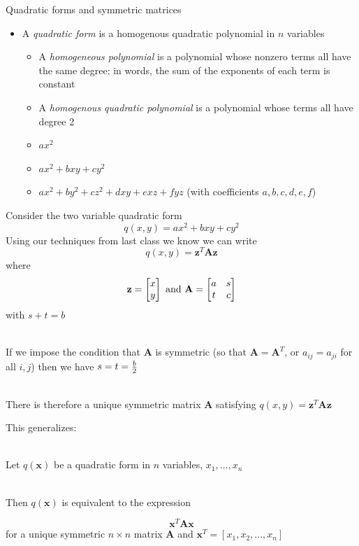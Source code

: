 \documentclass[10pt]{seminar}
\begin{document}
\begin{slide}
Quadratic forms and symmetric matrices

\begin{itemize}
\item A \textit{quadratic form} is a homogenous quadratic polynomial in $n$ variables
\begin{itemize}
\item A \textit{homogeneous polynomial} is a polynomial whose nonzero terms all have the same degree: in words, the sum of the exponents of each term is constant
\item A \textit{homogenous quadratic polynomial} is a polynomial whose terms all have degree 2
\item $a x^2$
\item $ax^2+bxy+cy^2$
\item $a x^2+b y^2+c z^2+d xy+e xz+f yz$ (with coefficients $a, b, c, d, e, f$)
\end{itemize}

\end{itemize}
\newslide

Consider the two variable quadratic form
$$q(x, y)=ax^2+bxy+cy^2$$
Using our techniques from last class we know we can write $$q(x, y)=\mathbf{z}^T\mathbf{A}\mathbf{z}$$ where $$\mathbf{z}=\begin{bmatrix}
x\\y
\end{bmatrix} \hbox{ and }\mathbf{A}=
\begin{bmatrix}
a & s \\
t& c
\end{bmatrix} 
$$
with $s+t=b$

\ \\If we impose the condition that $\mathbf{A}$ is symmetric (so that $\mathbf{A}=\mathbf{A}^T$, or $a_{ij}=a_{ji}$ for all $i, j$) then we have $s=t={b\over 2}$
 
 \ \\There is therefore a unique symmetric matrix $\mathbf{A}$ satisfying $q(x, y)=\mathbf{z}^T\mathbf{A}\mathbf{z}$

\newslide

This generalizes:

\ \\Let $q(\mathbf{x})$ be a quadratic form in $n$ variables, $x_1, ..., x_n$

\ \\Then $q(\mathbf{x})$ is equivalent to the expression 

$$\mathbf{x}^T\mathbf{A}\mathbf{x}$$ for a unique symmetric $n\times n$ matrix $\mathbf{A}$ and $\mathbf{x}^T=[x_1, x_2, ..., x_n]$


\end{slide}
\end{document}
